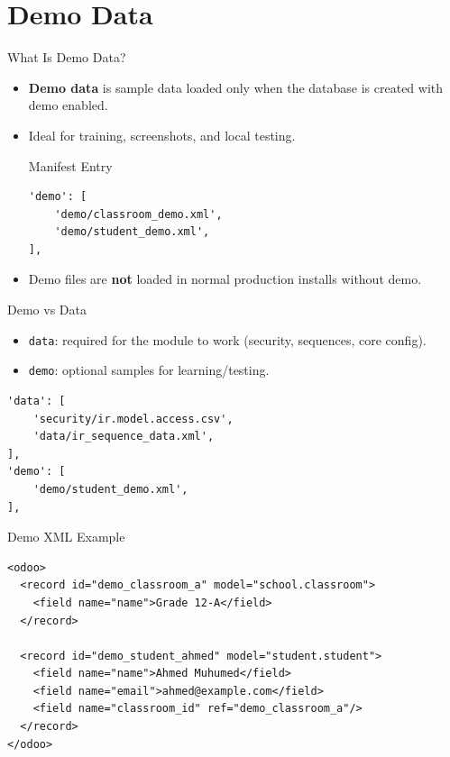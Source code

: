 \section{Demo Data}

\begin{frame}[fragile]{What Is Demo Data?}
	\begin{itemize}
		\item \textbf{Demo data} is sample data loaded only when the database is created with demo enabled.
		\item Ideal for training, screenshots, and local testing.
\begin{block}{Manifest Entry}
\begin{lstlisting}
'demo': [
	'demo/classroom_demo.xml',
	'demo/student_demo.xml',
],
\end{lstlisting}
\end{block}
		\item Demo files are \textbf{not} loaded in normal production installs without demo.
	\end{itemize}
\end{frame}

\begin{frame}[fragile]{Demo vs Data}
	\begin{itemize}
		\item \texttt{data}: required for the module to work (security, sequences, core config).
		\item \texttt{demo}: optional samples for learning/testing.
	\end{itemize}
\begin{lstlisting}
'data': [
	'security/ir.model.access.csv',
	'data/ir_sequence_data.xml',
],
'demo': [
	'demo/student_demo.xml',
],
\end{lstlisting}
\end{frame}

\begin{frame}[fragile]{Demo XML Example}
\begin{lstlisting}[style=xml]
<odoo>
  <record id="demo_classroom_a" model="school.classroom">
	<field name="name">Grade 12-A</field>
  </record>

  <record id="demo_student_ahmed" model="student.student">
	<field name="name">Ahmed Muhumed</field>
	<field name="email">ahmed@example.com</field>
	<field name="classroom_id" ref="demo_classroom_a"/>
  </record>
</odoo>
\end{lstlisting}
\end{frame}

